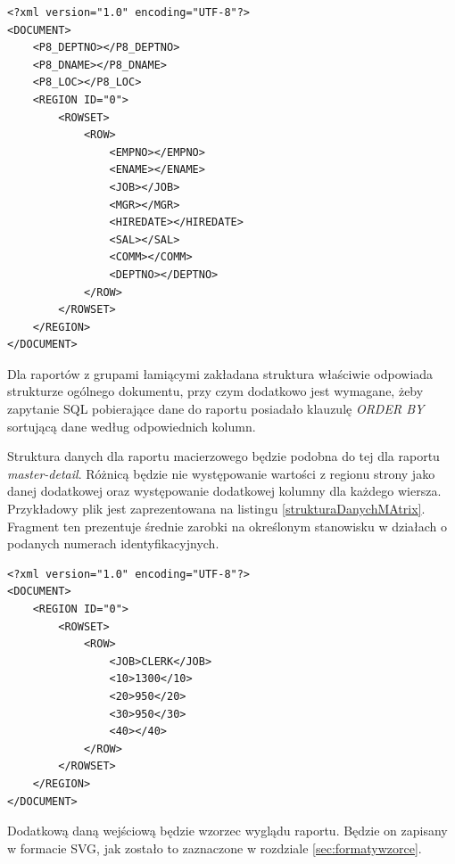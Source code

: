 \documentclass[11pt,a4paper]{article}
\begin{document}
\lstset{language=XML}
\begin{lstlisting}[frame=single,caption=Struktura pliku z danymi wejściowymi dla raportu master-detail,label=strukturaDanychMD]
<?xml version="1.0" encoding="UTF-8"?>
<DOCUMENT>
    <P8_DEPTNO></P8_DEPTNO>
    <P8_DNAME></P8_DNAME>
    <P8_LOC></P8_LOC>
    <REGION ID="0">
        <ROWSET>
            <ROW>
                <EMPNO></EMPNO>
                <ENAME></ENAME>
                <JOB></JOB>
                <MGR></MGR>
                <HIREDATE></HIREDATE>
                <SAL></SAL>
                <COMM></COMM>
                <DEPTNO></DEPTNO>
            </ROW>
        </ROWSET>
    </REGION>
</DOCUMENT>
\end{lstlisting}


Dla raportów z grupami łamiącymi zakładana struktura właściwie odpowiada strukturze ogólnego dokumentu, przy czym dodatkowo jest wymagane, żeby zapytanie SQL pobierające dane do raportu posiadało klauzulę \emph{ORDER BY} sortującą dane według odpowiednich kolumn.

Struktura danych dla raportu macierzowego będzie podobna do tej dla raportu \emph{master-detail}. Różnicą będzie nie występowanie wartości z regionu strony jako danej dodatkowej oraz występowanie dodatkowej kolumny dla każdego wiersza. Przykładowy plik jest zaprezentowana na listingu \ref{strukturaDanychMAtrix}. Fragment ten prezentuje średnie zarobki na określonym stanowisku w działach o podanych numerach identyfikacyjnych.

\lstset{language=XML}
\begin{lstlisting}[frame=single,caption=Zakładana struktura pliku z danymi wejściowymi dla raportu macierzowego,label=strukturaDanychMAtrix]
<?xml version="1.0" encoding="UTF-8"?>
<DOCUMENT>
    <REGION ID="0">
        <ROWSET>
            <ROW>
                <JOB>CLERK</JOB>
                <10>1300</10>
                <20>950</20>
                <30>950</30>
                <40></40>
            </ROW>
        </ROWSET>
    </REGION>
</DOCUMENT>
\end{lstlisting}


Dodatkową daną wejściową będzie wzorzec wyglądu raportu. Będzie on zapisany w formacie SVG, jak zostało to zaznaczone w rozdziale \ref{sec:formatywzorce}.
\end{document}

